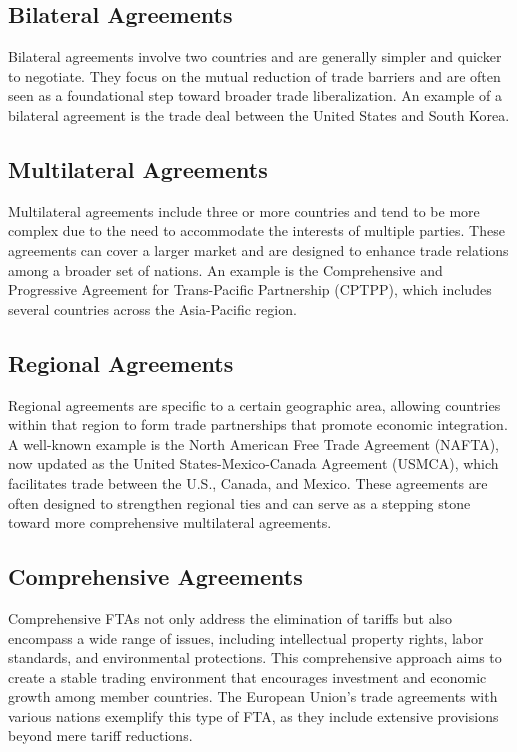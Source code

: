 \documentclass[12pt]{article}
\begin{document}
\subsection{Bilateral Agreements}
Bilateral agreements involve two countries and are generally simpler and quicker to negotiate. They focus on the mutual reduction of trade barriers and are often seen as a foundational step toward broader trade liberalization. An example of a bilateral agreement is the trade deal between the United States and South Korea.

\subsection{Multilateral Agreements}
Multilateral agreements include three or more countries and tend to be more complex due to the need to accommodate the interests of multiple parties. These agreements can cover a larger market and are designed to enhance trade relations among a broader set of nations. An example is the Comprehensive and Progressive Agreement for Trans-Pacific Partnership (CPTPP), which includes several countries across the Asia-Pacific region.

\subsection{Regional Agreements}
Regional agreements are specific to a certain geographic area, allowing countries within that region to form trade partnerships that promote economic integration. A well-known example is the North American Free Trade Agreement (NAFTA), now updated as the United States-Mexico-Canada Agreement (USMCA), which facilitates trade between the U.S., Canada, and Mexico. These agreements are often designed to strengthen regional ties and can serve as a stepping stone toward more comprehensive multilateral agreements.

\subsection{Comprehensive Agreements}
Comprehensive FTAs not only address the elimination of tariffs but also encompass a wide range of issues, including intellectual property rights, labor standards, and environmental protections. This comprehensive approach aims to create a stable trading environment that encourages investment and economic growth among member countries. The European Union's trade agreements with various nations exemplify this type of FTA, as they include extensive provisions beyond mere tariff reductions.
\end{document}
